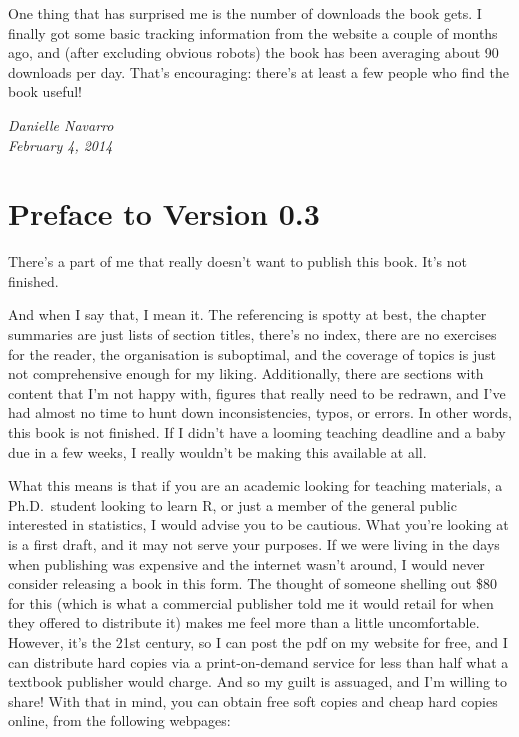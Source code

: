 \documentclass[
  letterpaper,
]{book}
\begin{document}
One thing that has surprised me is the number of downloads the book
gets. I finally got some basic tracking information from the website a
couple of months ago, and (after excluding obvious robots) the book has
been averaging about 90 downloads per day. That's encouraging: there's
at least a few people who find the book useful!

\emph{Danielle Navarro\\
February 4, 2014}

\hypertarget{preface-to-version-0.3}{%
\section*{Preface to Version 0.3}\label{preface-to-version-0.3}}

There's a part of me that really doesn't want to publish this book. It's
not finished.

And when I say that, I mean it. The referencing is spotty at best, the
chapter summaries are just lists of section titles, there's no index,
there are no exercises for the reader, the organisation is suboptimal,
and the coverage of topics is just not comprehensive enough for my
liking. Additionally, there are sections with content that I'm not happy
with, figures that really need to be redrawn, and I've had almost no
time to hunt down inconsistencies, typos, or errors. In other words,
this book is not finished. If I didn't have a looming teaching deadline
and a baby due in a few weeks, I really wouldn't be making this
available at all.

What this means is that if you are an academic looking for teaching
materials, a Ph.D.~student looking to learn R, or just a member of the
general public interested in statistics, I would advise you to be
cautious. What you're looking at is a first draft, and it may not serve
your purposes. If we were living in the days when publishing was
expensive and the internet wasn't around, I would never consider
releasing a book in this form. The thought of someone shelling out \$80
for this (which is what a commercial publisher told me it would retail
for when they offered to distribute it) makes me feel more than a little
uncomfortable. However, it's the 21st century, so I can post the pdf on
my website for free, and I can distribute hard copies via a
print-on-demand service for less than half what a textbook publisher
would charge. And so my guilt is assuaged, and I'm willing to share!
With that in mind, you can obtain free soft copies and cheap hard copies
online, from the following webpages:
\end{document}
